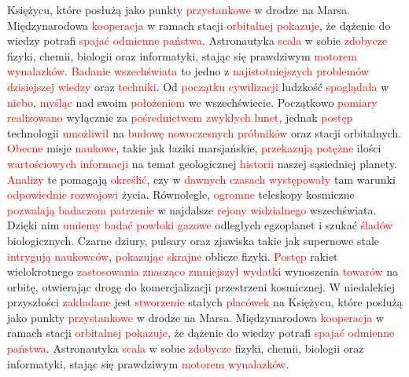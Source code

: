 \documentclass[12pt,a4paper]{article}
\begin{document}
Księżycu, które posłużą jako punkty \textcolor{red}{przystankowe} w drodze na Marsa. Międzynarodowa \textcolor{red}{kooperacja} w ramach stacji \textcolor{red}{orbitalnej} \textcolor{red}{pokazuje}, że dążenie do wiedzy potrafi \textcolor{red}{spajać} \textcolor{red}{odmienne} \textcolor{red}{państwa}. Astronautyka \textcolor{red}{scala} w sobie \textcolor{red}{zdobycze} fizyki, chemii, biologii oraz informatyki, stając się prawdziwym \textcolor{red}{motorem} \textcolor{red}{wynalazków}. \textcolor{red}{Badanie} \textcolor{red}{wszechświata} to jedno z \textcolor{red}{najistotniejszych} \textcolor{red}{problemów} \textcolor{red}{dzisiejszej} \textcolor{red}{wiedzy} oraz \textcolor{red}{techniki}. Od \textcolor{red}{początku} \textcolor{red}{cywilizacji} ludzkość \textcolor{red}{spoglądała} w \textcolor{red}{niebo}, \textcolor{red}{myśląc} nad swoim \textcolor{red}{położeniem} we wszechświecie. Początkowo \textcolor{red}{pomiary} \textcolor{red}{realizowano} wyłącznie za \textcolor{red}{pośrednictwem} \textcolor{red}{zwykłych} \textcolor{red}{lunet}, jednak \textcolor{red}{postęp} technologii \textcolor{red}{umożliwił} na \textcolor{red}{budowę} \textcolor{red}{nowoczesnych} \textcolor{red}{próbników} oraz stacji orbitalnych. \textcolor{red}{Obecne} misje \textcolor{red}{naukowe}, takie jak łaziki marsjańskie, \textcolor{red}{przekazują} \textcolor{red}{potężne} ilości \textcolor{red}{wartościowych} \textcolor{red}{informacji} na temat geologicznej \textcolor{red}{historii} naszej sąsiedniej planety. \textcolor{red}{Analizy} te pomagają \textcolor{red}{określić}, czy w \textcolor{red}{dawnych} \textcolor{red}{czasach} \textcolor{red}{występowały} tam warunki \textcolor{red}{odpowiednie} \textcolor{red}{rozwojowi} życia. Równolegle, \textcolor{red}{ogromne} teleskopy kosmiczne \textcolor{red}{pozwalają} \textcolor{red}{badaczom} \textcolor{red}{patrzenie} w najdalsze \textcolor{red}{rejony} \textcolor{red}{widzialnego} wszechświata. Dzięki nim \textcolor{red}{umiemy} \textcolor{red}{badać} \textcolor{red}{powłoki} \textcolor{red}{gazowe} odległych egzoplanet i szukać \textcolor{red}{śladów} biologicznych. Czarne dziury, pulsary oraz zjawiska takie jak supernowe stale \textcolor{red}{intrygują} \textcolor{red}{naukowców}, \textcolor{red}{pokazując} \textcolor{red}{skrajne} oblicze fizyki. \textcolor{red}{Postęp} rakiet wielokrotnego \textcolor{red}{zastosowania} \textcolor{red}{znacząco} \textcolor{red}{zmniejszył} \textcolor{red}{wydatki} wynoszenia \textcolor{red}{towarów} na orbitę, otwierając drogę do komercjalizacji przestrzeni kosmicznej. W niedalekiej przyszłości \textcolor{red}{zakładane} jest \textcolor{red}{stworzenie} stałych \textcolor{red}{placówek} na Księżycu, które posłużą jako punkty \textcolor{red}{przystankowe} w drodze na Marsa. Międzynarodowa \textcolor{red}{kooperacja} w ramach stacji \textcolor{red}{orbitalnej} \textcolor{red}{pokazuje}, że dążenie do wiedzy potrafi \textcolor{red}{spajać} \textcolor{red}{odmienne} \textcolor{red}{państwa}. Astronautyka \textcolor{red}{scala} w sobie \textcolor{red}{zdobycze} fizyki, chemii, biologii oraz informatyki, stając się prawdziwym \textcolor{red}{motorem} \textcolor{red}{wynalazków}.
\end{document}
